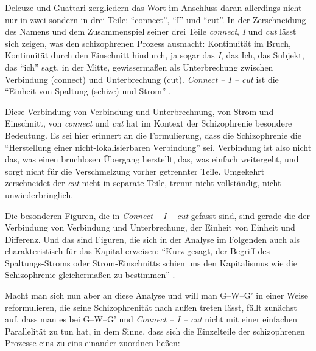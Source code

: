 \documentclass[12pt,
               paper=a4,
               twoside=false,
               onehalfspacing,
               bibliography=totoc,
               toc=graduated,
               ]{scrartcl}
\newcommand{\pc}[2]{\parencite[#1]{#2}}
\newcommand{\vgl}[2]{\parencite[vgl.][#1]{#2}}
\newcommand{\worries}[1]{\ifdraft{\textcolor{blue}{\texttt{(#1)}}}{}}
\newcommand{\gwg}{G--W--G'\xspace}
\newcommand{\cic}{Connect -- I -- cut\xspace}
\newcommand{\dg}{Deleuze und Guattari\xspace}
\begin{document}
\dg zergliedern das Wort im Anschluss daran allerdings nicht nur in
zwei sondern in drei Teile: \enquote{connect}, \enquote{I} und
\enquote{cut}.
In der Zerschneidung des Namens und dem Zusammenspiel seiner drei
Teile \emph{connect}, \emph{I} und \emph{cut} lässt sich zeigen, was
den schizophrenen Prozess ausmacht: Kontinuität im Bruch, Kontinuität
durch den Einschnitt hindurch, ja sogar das \emph{I}, das Ich, das
Subjekt, das "`ich"' sagt, in der Mitte, gewissermaßen als
Unterbrechung zwischen Verbindung (connect) und Unterbrechung (cut).
\emph{\cic} ist die "`Einheit von Spaltung (schize) und Strom"'
\pc{296}{ao}.


Diese Verbindung von Verbindung und Unterbrechnung, von Strom und
Einschnitt, von \emph{connect} und \emph{cut} hat im Kontext der
Schizophrenie besondere Bedeutung. Es sei hier erinnert an die
Formulierung, dass die Schizophrenie die "`Herstellung einer
nicht-lokalisierbaren Verbindung"' \pc{19}{schizg} sei. Verbindung ist
also nicht das, was einen bruchlosen Übergang herstellt, das, was
einfach weitergeht, und sorgt nicht für die Verschmelzung vorher
getrennter Teile. Umgekehrt zerschneidet der \emph{cut} nicht in
separate Teile, trennt nicht vollständig, nicht unwiederbringlich.

Die besonderen Figuren, die in \emph{\cic} gefasst sind, sind gerade
die der Verbindung von Verbindung und Unterbrechung, der Einheit von
Einheit und Differenz. Und das sind Figuren, die sich in der Analyse
im Folgenden auch als charakteristisch für das Kapital erweisen:
"`Kurz gesagt, der Begriff des Spaltungs-Stroms oder Strom-Einschnitts
schien uns den Kapitalismus wie die Schizophrenie gleichermaßen zu
bestimmen"' \pc{317}{ao}.



Macht man sich nun aber an diese Analyse und will man \gwg in einer
Weise reformulieren, die seine Schizophrenität nach außen treten
lässt, fällt zunächst auf, dass man es bei \gwg und \emph{\cic} nicht
mit einer einfachen Parallelität zu tun hat, in dem Sinne, dass sich
die Einzelteile der schizophrenen Prozesse eins zu eins einander
zuordnen ließen:
\end{document}
